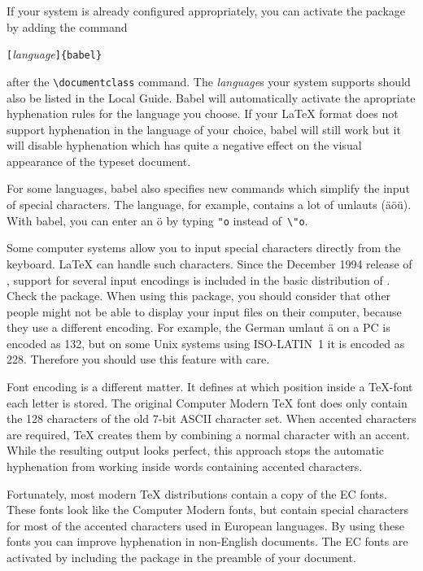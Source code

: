 If your system is already configured appropriately, you can activate
the  package by adding the command
\begin{command}
\verb|[|\emph{language}\verb|]{babel}| 
\end{command}
\noindent after the \verb|\documentclass| command. The \emph{language}s your
system supports should also be listed in the Local Guide. Babel will
automatically activate the apropriate hyphenation rules for the
language you choose. If your \LaTeX{} format does not support
hyphenation in the language of your choice, babel will still work but
it will disable hyphenation which has quite a negative effect on the
visual appearance of the typeset document.

For some languages, \textsf{babel} also specifies new commands which
simplify the input of special characters. The  language, for
example, contains a lot of umlauts (\"a\"o\"u).  With \textsf{babel},
you can enter an \"o by typing \verb|"o| instead of~\verb|\"o|.

Some computer systems allow you to input special characters directly
from the keyboard. \LaTeX{} can handle such characters. Since the
December 1994 release of \LaTeXe{}, support for several input
encodings is included in the basic distribution of \LaTeXe. Check the
 package. When using this package, you should consider
that other people might not be able to display your input files on
their computer, because they use a different encoding. For example,
the German umlaut \"a on a PC is encoded as 132, but on some Unix
systems using ISO-LATIN~1 it is encoded as 228. Therefore you should
use this feature with care.


Font encoding is a different matter. It defines at which position inside
a \TeX-font each letter is stored. The original Computer Modern
\TeX{} font does only contain the 128 characters of the old 7-bit ASCII
character set. When accented characters are required, \TeX{} creates
them by combining a normal character with an accent. While the
resulting output looks perfect, this approach stops the automatic
hyphenation from working inside words containing accented characters.

Fortunately, most modern \TeX{} distributions contain a copy of the EC
fonts. These fonts look like the Computer Modern fonts, but contain
special characters for most of the accented characters used in
European languages. By using these fonts you can improve hyphenation
in non-English documents. The EC fonts are activated by including the
 package in the preamble of your document.


